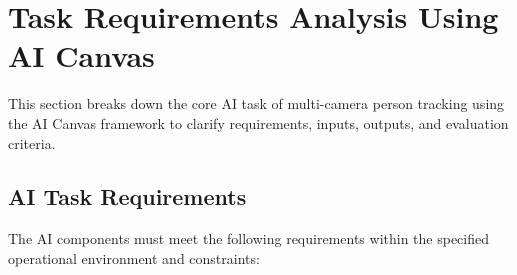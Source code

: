\section{Task Requirements Analysis Using AI Canvas}
\label{section:ai-canvas}

This section breaks down the core AI task of multi-camera person tracking using the AI Canvas framework to clarify requirements, inputs, outputs, and evaluation criteria.

\subsection{AI Task Requirements}
\label{subsection:ai-task-requirements}
The AI components must meet the following requirements within the specified operational environment and constraints:

